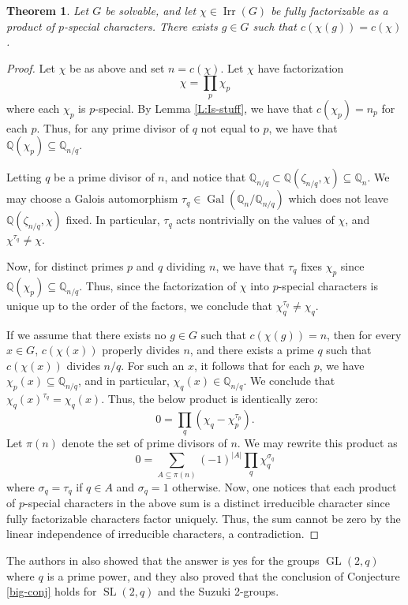 \documentclass[12pt]{amsart}
\newtheorem{theorem}{Theorem}[section]
\theoremstyle{definition}
\newcommand{\Q}{\mathbb{Q}}
\DeclareMathOperator{\GL}{GL}
\DeclareMathOperator{\SL}{SL}
\DeclareMathOperator{\Gal}{Gal}
\DeclareMathOperator{\Irr}{Irr}
\begin{document}
\begin{theorem}
	Let $G$ be solvable, and let $\chi \in \Irr(G)$ be fully factorizable as a product of $p$-special characters. There exists $g \in G$ such that $c(\chi(g)) = c(\chi)$.
\end{theorem}
\begin{proof}
	Let $\chi$ be as above and set $n = c(\chi)$. Let $\chi$ have factorization
	$$
	\chi = \prod_p \chi_p 
	$$
	where each $\chi_p$ is $p$-special.
	By Lemma \ref{L:Is-stuff}, we have that $c(\chi_p) = n_p$ for each $p$. Thus, for any prime divisor of $q$ not equal to $p$, we have that $\Q(\chi_p) \subseteq \Q_{n/q}$.
	
	Letting $q$ be a prime divisor of $n$, and notice that $\Q_{n/q} \subset \Q(\zeta_{n/q}, \chi) \subseteq \Q_n$. We may choose a Galois automorphism $\tau_q \in \Gal(\Q_n/\Q_{n/q})$ which does not leave $\Q(\zeta_{n/q}, \chi)$ fixed. In particular, $\tau_q$ acts nontrivially on the values of $\chi$, and $\chi^{\tau_q} \neq \chi$.
	
	Now, for distinct primes $p$ and $q$ dividing $n$, we have that $\tau_q$ fixes $\chi_p$ since $\Q(\chi_p) \subseteq \Q_{n/q}$. Thus, since the factorization of $\chi$ into $p$-special characters is unique up to the order of the factors, we conclude that $\chi_q^{\tau_q} \neq \chi_q$.  
	
	If we assume that there exists no $g \in G$ such that $c(\chi(g)) = n$, then for every $x \in G$,  $c(\chi(x))$ properly divides $n$, and there exists a prime $q$ such that $c(\chi(x))$ divides $n/q$. For such an $x$, it follows that for each $p$, we have $\chi_p(x) \subseteq \Q_{n/q}$, and in particular, $\chi_q(x) \in \Q_{n/q}$. We conclude that $\chi_q(x)^{\tau_q} = \chi_q(x)$.	Thus, the below product is identically zero:
	$$
	0= \prod_q (\chi_q - \chi_p^{\tau_p}).
	$$
	Let $\pi(n)$ denote the set of prime divisors of $n.$ We may rewrite this product as
	$$
	0= \sum_{A \subseteq \pi(n)} (-1)^{|A|}\prod_{q} \chi_q^{\sigma_q}
	$$
	where $\sigma_q = \tau_q$ if $q \in A$ and $\sigma_q = 1$ otherwise. Now, one notices that each product of $p$-special characters in the above sum is a distinct irreducible character since fully factorizable characters factor uniquely. Thus, the sum cannot be zero by the linear independence of irreducible characters, a contradiction.
\end{proof}

The authors in \cite{HH} also showed that the answer is yes for the groups $\GL(2,q)$ where $q$ is a prime power, and they also proved that the conclusion of Conjecture \ref{big-conj} holds for $\SL(2,q)$ and the Suzuki 2-groups.

\printbibliography[heading=bibintoc]	
	
\end{document}
